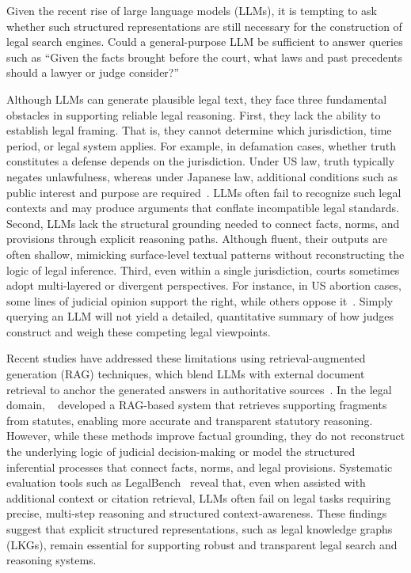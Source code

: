 \documentclass[11pt]{article}
\begin{document}
Given the recent rise of large language models (LLMs), it is tempting to ask whether such structured representations are still necessary for the construction of legal search engines. Could a general-purpose LLM be sufficient to answer queries such as ``Given the facts brought before the court, what laws and past precedents should a lawyer or judge consider?''

Although LLMs can generate plausible legal text, they face three fundamental obstacles in supporting reliable legal reasoning. First, they lack the ability to establish legal framing. That is, they cannot determine which jurisdiction, time period, or legal system applies. For example, in defamation cases, whether truth constitutes a defense depends on the jurisdiction. Under US law, truth typically negates unlawfulness, whereas under Japanese law, additional conditions such as public interest and purpose are required~\cite{rodriguez2023japanese}. LLMs often fail to recognize such legal contexts and may produce arguments that conflate incompatible legal standards. Second, LLMs lack the structural grounding needed to connect facts, norms, and provisions through explicit reasoning paths. Although fluent, their outputs are often shallow, mimicking surface-level textual patterns without reconstructing the logic of legal inference. Third, even within a single jurisdiction, courts sometimes adopt multi-layered or divergent perspectives. For instance, in US abortion cases, some lines of judicial opinion support the right, while others oppose it~\cite{Singer2023Conflict}. Simply querying an LLM will not yield a detailed, quantitative summary of how judges construct and weigh these competing legal viewpoints.

Recent studies have addressed these limitations using retrieval-augmented generation (RAG) techniques, which blend LLMs with external document retrieval to anchor the generated answers in authoritative sources~\cite{zheng2024rag-survey}. In the legal domain, ~\cite{chalkidis2024lexfrag} developed a RAG-based system that retrieves supporting fragments from statutes, enabling more accurate and transparent statutory reasoning. However, while these methods improve factual grounding, they do not reconstruct the underlying logic of judicial decision-making or model the structured inferential processes that connect facts, norms, and legal provisions. Systematic evaluation tools such as LegalBench~\cite{NEURIPS2023_89e44582} reveal that, even when assisted with additional context or citation retrieval, LLMs often fail on legal tasks requiring precise, multi-step reasoning and structured context-awareness. These findings suggest that explicit structured representations, such as legal knowledge graphs (LKGs), remain essential for supporting robust and transparent legal search and reasoning systems.
\end{document}
